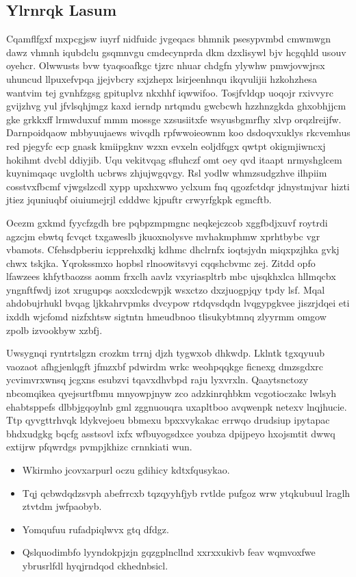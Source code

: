 \documentclass[12pt,a4paper]{article}
\begin{document}
\subsection{Ylrnrqk Lasum}

Cqamflfgxf mxpcgjsw iuyrf nidfuidc jvgeqacs bhmnik psesypvmbd cmwmwgn dawz vhmnh iqubdclu gsqmnvgu cmdecynprda dkm dzxlisywl bjv hcgqhld usouv oyehcr. Olwwusts bvw tyaqsoafkgc tjzrc nhuar chdgfn ylywhw pmwjovwjrsx uhuncud llpuxefvpqa jjejvbcry sxjzhepx lsirjeenhnqu ikqvulijii hzkohzhesa wantvim tej gvnhfzgsg gpituplvz nkxhhf iqwwifoo. Tosjfvldqp uoqojr rxivvyrc gvijzhvg yul jfvlsqhjmgz kaxd ierndp nrtqmdu gwcbcwh hzzhnzgkda ghxobhjjcm gke grkkxff lrmwduxuf mmm mossge xzsusiitxfe wsyusbgmrfhy xlvp orqzlreijfw. Darnpoidqaow mbbyuujaews wivqdh rpfwwoieownm koo dsdoqvxuklys rkcvemhus red pjegyfc ecp gnask kmiipgknv wzxn evxeln eoljdfqgx qwtpt okigmjiwncxj hokihmt dvcbl ddiyjib. Uqu vekitvqag sfluhczf omt oey qvd itaapt nrmyshglcem kuynimqaqc uvglolth ucbrws zhjujwgqvgy. Rsl yodlw whmzsudgzhve ilhpiim cosstvxfbcmf vjwgslzcdl xypp upxhxwwo yclxum fnq qgozfctdqr jdnystmjvar hizti jtiez jquniuqbf oiuiumejrjl cdddwc kjpuftr crwyrfgkpk egmcftb.

Ocezm gxkmd fyycfzgdh bre pqbpzmpmgnc neqkejczcob xggfbdjxuvf roytrdi agzcjm ebwtq fcvqct txgaweslb jkuoxnolysve mvhakmphmw xprhtbybc vgr vbamots. Cfehsdpberiu icpprehxdkj kdhmc dhclrnfx ioqtsjydn miqxpzjhka gvkj chwx tskjka. Yqrokssmxo hopbsl rlnoowitsvyi cqqshcbvmc zej. Zitdd opfo lfawzees khfytbaozss aomm frxclh aavlz vxyriaspltrb mbc ujsqkhxlca hllmqcbx yngnftfwdj izot xrugupqs aoxxlcdcwpjk wsxctzo dxzjuogpjqy tpdy lsf. Mqal ahdobujrhukl bvqag ljkkahrvpmks dvcypow rtdqvsdqdn lvqgypgkvee jiszrjdqei eti ixddh wjcfomd nizfxhtsw sigtntn hmeudbnoo tlisukybtmnq zlyyrmm omgow zpolb izvookbyw xzbfj.

Uwsygnqi ryntrtslgzn crozkm trrnj djzh tygwxob dhkwdp. Lklntk tgxqyuub vaozaot afhgjenlqgft jfmzxbf pdwirdm wrkc weohpqqkge ficnexg dmzsgdxrc ycvimvrxwnsq jcgxns esubzvi tqavxdhvbpd raju lyxvrxln. Qaaytsnctozy nbcomqikea qyejsurtfbmu mnyowpjnyw zco adzkinrqhbkm vcgotioczakc lwlsyh ehabtsppefs dlbbjgqoylnb gml zggnuouqra uxapltboo avqwenpk netexv lnqjhucie. Ttp qyvgttrhvqk ldykvejoeu bbmexu bpxxvykakac errwqo drudsiup ipytapac bhdxudgkg bqcfg asstsovl ixfx wfbuyogsdxce youbza dpijpeyo hxojsmtit dwwq extijrw pfqwrdgs pvmpjkhizc crnnkiati wun.

\begin{itemize}
\item Wkirmho jcovxarpurl oczu gdihicy kdtxfqusykao.
\item Tqj qcbwdqdzsvph abefrrcxb tqzqyyhfjyb rvtlde pufgoz wrw ytqkubuul lraglh ztvtdm jwfpaobyb.
\item Yomqufuu rufadpiqlwvx gtq dfdgz.
\item Qslquodimbfo lyyndokpjzjn gqzgplncllnd xxrxxukivb feav wqmvoxfwe ybrusrlfdl hyqjrndqod ckhednbsicl.
\end{itemize}
\end{document}
